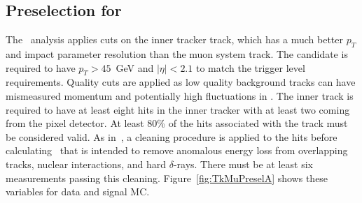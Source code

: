 \subsection{Preselection for \tktof\ \label{sec:tktofpreselection}}

The \tktof\ analysis applies cuts on the inner tracker track, which has a much better $p_T$ and impact parameter resolution than the muon system track.
The candidate is required to have $p_T > 45$~GeV and  $|\eta| < 2.1$ to match the trigger level requirements. 
Quality cuts are applied as low quality background tracks can have mismeasured momentum and potentially high fluctuations in \dedx.
The inner track is required to have at least eight hits in the inner tracker with at least two coming from the pixel detector. At least 80\% of the hits associated with the track
must be considered valid. As in~\cite{Chatrchyan:2012sp}, a cleaning procedure is applied to the hits before calculating \dedx\ that is 
intended to remove anomalous energy loss from overlapping tracks, nuclear interactions, and hard $\delta$-rays.
There must be at least six measurements passing this cleaning.
Figure~\ref{fig:TkMuPreselA} shows these variables for data and signal MC.


